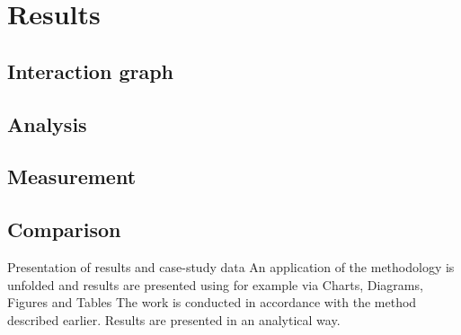 \chapter{Results} \label{ch:results}


\section{Interaction graph}
\section{Analysis}
\section{Measurement}
\section{Comparison}

Presentation of results and case-study data 
An application of the methodology is unfolded and results are presented using for example via Charts, Diagrams, Figures and Tables 
The work is conducted in accordance with the method described earlier. Results are presented in an analytical way.
